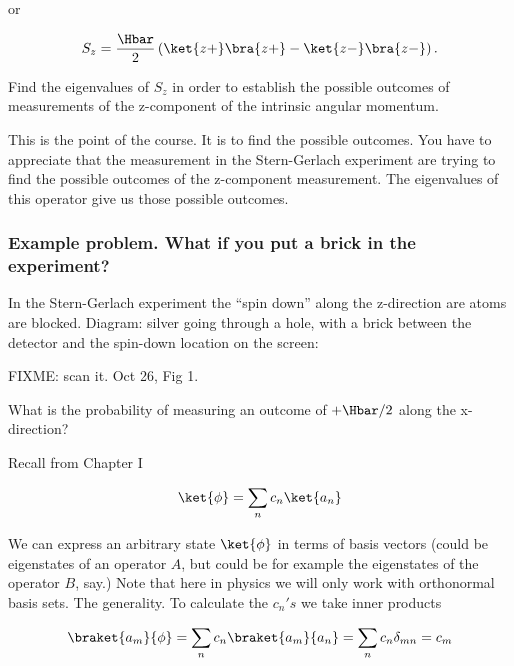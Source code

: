 or

\begin{equation}\label{eqn:PHY356Foct26:102}
\begin{aligned}
S_z = \frac{\Hbar}{2}
\left( \ket{z+}\bra{z+} - \ket{z-}\bra{z-} \right).
\end{aligned}
\end{equation}

Find the eigenvalues of \(S_z\) in order to establish the possible outcomes of measurements of the z-component of the intrinsic angular momentum.

This is the point of the course.  It is to find the possible outcomes.  You have to appreciate that the measurement in the Stern-Gerlach experiment are trying to find the possible outcomes of the z-component measurement.  The eigenvalues of this operator give us those possible outcomes.

\subsubsection{Example problem.  What if you put a brick in the experiment?}

In the Stern-Gerlach experiment the ``spin down'' along the z-direction are atoms are blocked.  Diagram: silver going through a hole, with a brick between the detector and the spin-down location on the screen:

FIXME: scan it.  Oct 26, Fig 1.

What is the probability of measuring an outcome of \(+\Hbar/2\) along the x-direction?

Recall from Chapter I

\begin{equation}\label{eqn:PHY356Foct26:103}
\begin{aligned}
\ket{\phi} = \sum_n c_n \ket{a_n}
\end{aligned}
\end{equation}

We can express an arbitrary state \(\ket{\phi}\) in terms of basis vectors (could be eigenstates of an operator \(A\), but could be for example the eigenstates of the operator \(B\), say.)  Note that here in physics we will only work with orthonormal basis sets.  The generality.  To calculate the \(c_n's\) we take inner products

\begin{equation}\label{eqn:PHY356Foct26:104}
\begin{aligned}
\braket{a_m}{\phi} = \sum_n c_n \braket{a_m}{a_n} = \sum_n c_n \delta_{mn} = c_m
\end{aligned}
\end{equation}


